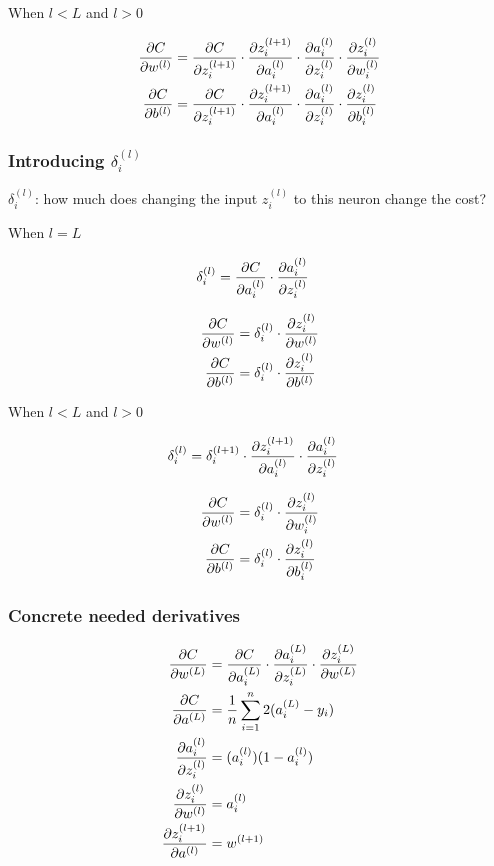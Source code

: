\documentclass{article}
\begin{document}
When $l < L$ and $l > 0$

\begin{align}
\frac{\partial C}{\partial w^{(l)}} &= \frac{\partial C}{\partial z_i^{(l+1)}}
  \cdot \frac{\partial z_i^{(l+1)}}{\partial a_i^{(l)}}
  \cdot \frac{\partial a_i^{(l)}}{\partial z_i^{(l)}}
  \cdot \frac{\partial z_i^{(l)}}{\partial w_i^{(l)}} \\
\frac{\partial C}{\partial b^{(l)}} &= \frac{\partial C}{\partial z_i^{(l+1)}}
  \cdot \frac{\partial z_i^{(l+1)}}{\partial a_i^{(l)}}
  \cdot \frac{\partial a_i^{(l)}}{\partial z_i^{(l)}}
  \cdot \frac{\partial z_i^{(l)}}{\partial b_i^{(l)}}
\end{align}

\subsubsection{Introducing $\delta_i^{(l)}$}

$\delta_i^{(l)}$: how much does changing the input $z_i^{(l)}$
to this neuron change the cost?

When $l = L$

\begin{align}
\delta_i^{(l)} &= \frac{\partial C}{\partial a_i^{(l)}} \cdot \frac{\partial a_i^{(l)}}{\partial z_i^{(l)}}
\end{align}

\begin{align}
\frac{\partial C}{\partial w^{(l)}} &= \delta_i^{(l)}
  \cdot \frac{\partial z_i^{(l)}}{\partial w^{(l)}} \\
\frac{\partial C}{\partial b^{(l)}} &= \delta_i^{(l)}
  \cdot \frac{\partial z_i^{(l)}}{\partial b^{(l)}}
\end{align}

When $l < L$ and $l > 0$

\begin{align}
\delta_i^{(l)} &= \delta_i^{(l+1)} 
  \cdot \frac{\partial z_i^{(l+1)}}{\partial a_i^{(l)}}
  \cdot \frac{\partial a_i^{(l)}}{\partial z_i^{(l)}}
\end{align}

\begin{align}
\frac{\partial C}{\partial w^{(l)}} &= \delta_i^{(l)}
  \cdot \frac{\partial z_i^{(l)}}{\partial w_i^{(l)}} \\
\frac{\partial C}{\partial b^{(l)}} &= \delta_i^{(l)}
  \cdot \frac{\partial z_i^{(l)}}{\partial b_i^{(l)}}
\end{align}

\subsubsection{Concrete needed derivatives}

\begin{align}
\pd{C}{w^{(L)}} &= \pd{C}{a_i^{(L)}}\cdot\pd{a_i^{(L)}}{z_i^{(L)}}\cdot\pd{z_i^{(L)}}{w^{(L)}} \\
\pd{C}{a^{(L)}} &= \avgsum[i,n] 2 (a_i^{(L)} - y_i) \\
\pd{a_i^{(l)}}{z_i^{(l)}} &= ({a_i^{(l)}}) (1-{a_i^{(l)}}) \\
\pd{z_i^{(l)}}{w^{(l)}} & = a_i^{(l)} \\
\pd{z_i^{(l+1)}}{a^{(l)}} & = w^{(l+1)}
\end{align}
\end{document}
